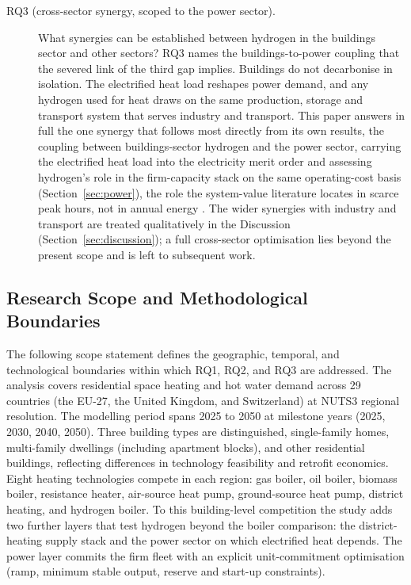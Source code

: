 \begin{description}
  \item[RQ3 (cross-sector synergy, scoped to the power sector).] What synergies can
  be established between hydrogen in the buildings sector and other sectors? RQ3
  names the buildings-to-power coupling that the severed link of the third gap
  implies. Buildings do not decarbonise in isolation. The electrified heat load
  reshapes power demand, and any hydrogen used for heat draws on the same
  production, storage and transport system that serves industry and transport. This
  paper answers in full the one synergy that follows most directly from its own
  results, the coupling between buildings-sector hydrogen and the power sector,
  carrying the electrified heat load into the electricity merit order and assessing
  hydrogen's role in the firm-capacity stack on the same operating-cost basis
  (Section~\ref{sec:power}), the role the system-value literature locates in scarce
  peak hours, not in annual energy \citep{Brown2018Synergies,Zeyen2021Mitigating}. The wider synergies with industry and
  transport are treated qualitatively in the Discussion
  (Section~\ref{sec:discussion}); a full cross-sector optimisation lies beyond the
  present scope and is left to subsequent work.
\end{description}

\subsection{Research Scope and Methodological Boundaries}

The following scope statement defines the geographic, temporal, and technological
boundaries within which RQ1, RQ2, and RQ3 are addressed. The analysis covers
residential space heating and hot water demand across 29 countries (the EU-27,
the United Kingdom, and Switzerland) at NUTS3 regional resolution. The modelling
period spans 2025 to 2050 at milestone years (2025, 2030, 2040, 2050). Three
building types are distinguished, single-family homes, multi-family dwellings
(including apartment blocks), and other residential buildings, reflecting
differences in technology feasibility and retrofit economics. Eight heating
technologies compete in each region: gas boiler, oil boiler, biomass boiler,
resistance heater, air-source heat pump, ground-source heat pump, district
heating, and hydrogen boiler. To this building-level competition the study adds
two further layers that test hydrogen beyond the boiler comparison: the
district-heating supply stack and the power sector on which electrified heat
depends. The power layer commits the firm fleet with an explicit unit-commitment
optimisation (ramp, minimum stable output, reserve and start-up constraints).

